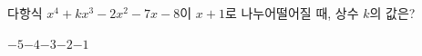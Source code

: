 다항식 $x^4+kx^3-2x^2-7x-8$이 $x+1$로 나누어떨어질 때, 상수 $k$의 값은?
\begin{choices32}{$-5$}{$-4$}{$-3$}{$-2$}{$-1$}\end{choices32}
